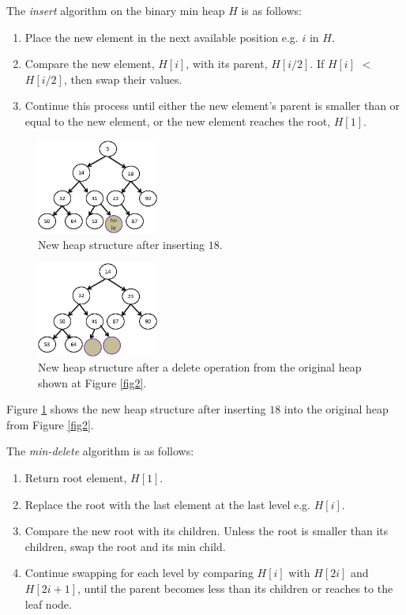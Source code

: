 The {\it insert} algorithm on the binary min heap $H$ is as follows:
\begin{enumerate}
\item Place the new element in the next available position e.g. $i$ in $H$.
\item Compare the new element, $H[i]$, with its parent, $H[i/2]$. If $H[i]$ $<$ $H[i/2]$, then swap their values.
\item Continue this process until either the new element's parent is smaller than or equal to the new element, or the new element reaches the root, $H[1]$.
\end{enumerate}

\begin{figure}[!ht]
  \centering
  \includegraphics[width=4cm]{fig/fig3.png}
      \caption{New heap structure after inserting $18$.}
    \label{fig3}
\end{figure}

\begin{figure}[!ht]
  \centering
  \includegraphics[width=4cm]{fig/fig4.png}
      \caption{New heap structure after a delete operation from the original heap shown at Figure \ref{fig2}.}
    \label{fig4}
\end{figure}

Figure \ref{fig3} shows the new heap structure after inserting $18$ into the original heap from Figure \ref{fig2}.

The {\it min-delete} algorithm is as follows:
\begin{enumerate}
\item Return root element, $H[1]$.
\item Replace the root with the last element at the last level e.g. $H[i]$.
\item Compare the new root with its children. Unless the root is smaller than its children, swap the root and its min child.
\item Continue swapping for each level by comparing $H[i]$ with $H[2i]$ and $H[2i+1]$, until the parent becomes less than its children or reaches to the leaf node.
\end{enumerate}


